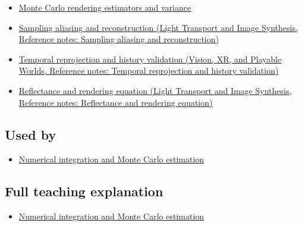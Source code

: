 \hypertarget{appendix-68be451b78b1-prerequisites}{}

\begin{itemize}
\tightlist
\item
  \hyperref[appendix-031e02bf28af]{Monte Carlo rendering estimators and variance}
\item
  \href{../04-Light-Transport-and-Image-Synthesis/main.pdf\#nameddest=appendix-6a7869dd79a6}{Sampling aliasing and reconstruction (Light Transport and Image Synthesis, Reference notes: Sampling aliasing and reconstruction)}
\item
  \href{../07-Vision-XR-and-Playable-Worlds/main.pdf\#nameddest=appendix-0727340a4428}{Temporal reprojection and history validation (Vision, XR, and Playable Worlds, Reference notes: Temporal reprojection and history validation)}
\item
  \href{../04-Light-Transport-and-Image-Synthesis/main.pdf\#nameddest=appendix-96da0b153b77}{Reflectance and rendering equation (Light Transport and Image Synthesis, Reference notes: Reflectance and rendering equation)}
\end{itemize}

\subsection{Used by}\label{appendix-68be451b78b1-used-by}

\hypertarget{appendix-68be451b78b1-used-by}{}

\begin{itemize}
\tightlist
\item
  \hyperref[03-visual-computing-i-ch012-numerical-integration-and-monte-carlo-estimation]{Numerical integration and Monte Carlo estimation}
\end{itemize}

\subsection{Full teaching explanation}\label{appendix-68be451b78b1-full-teaching-explanation}

\hypertarget{appendix-68be451b78b1-full-teaching-explanation}{}

\begin{itemize}
\tightlist
\item
  \hyperref[03-visual-computing-i-ch012-numerical-integration-and-monte-carlo-estimation]{Numerical integration and Monte Carlo estimation}
\end{itemize}

